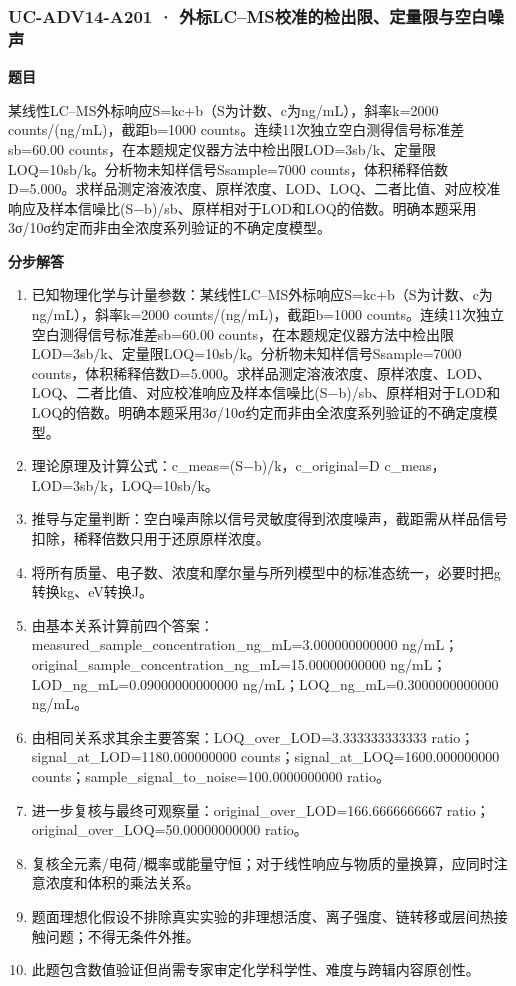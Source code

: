 \documentclass[UTF8,11pt,a4paper]{ctexart}
\begin{document}
\subsubsection*{UC-ADV14-A201 · 外标LC–MS校准的检出限、定量限与空白噪声}
\noindent\textbf{题目}\par
某线性LC–MS外标响应S=kc+b（S为计数、c为ng/mL），斜率k=2000 counts/(ng/mL)，截距b=1000 counts。连续11次独立空白测得信号标准差sb=60.00 counts，在本题规定仪器方法中检出限LOD=3sb/k、定量限LOQ=10sb/k。分析物未知样信号Ssample=7000 counts，体积稀释倍数D=5.000。求样品测定溶液浓度、原样浓度、LOD、LOQ、二者比值、对应校准响应及样本信噪比(S−b)/sb、原样相对于LOD和LOQ的倍数。明确本题采用3σ/10σ约定而非由全浓度系列验证的不确定度模型。\par
\medskip\noindent\textbf{分步解答}
\begin{enumerate}
\item 已知物理化学与计量参数：某线性LC–MS外标响应S=kc+b（S为计数、c为ng/mL），斜率k=2000 counts/(ng/mL)，截距b=1000 counts。连续11次独立空白测得信号标准差sb=60.00 counts，在本题规定仪器方法中检出限LOD=3sb/k、定量限LOQ=10sb/k。分析物未知样信号Ssample=7000 counts，体积稀释倍数D=5.000。求样品测定溶液浓度、原样浓度、LOD、LOQ、二者比值、对应校准响应及样本信噪比(S−b)/sb、原样相对于LOD和LOQ的倍数。明确本题采用3σ/10σ约定而非由全浓度系列验证的不确定度模型。
\item 理论原理及计算公式：c\_meas=(S−b)/k，c\_original=D c\_meas，LOD=3sb/k，LOQ=10sb/k。
\item 推导与定量判断：空白噪声除以信号灵敏度得到浓度噪声，截距需从样品信号扣除，稀释倍数只用于还原原样浓度。
\item 将所有质量、电子数、浓度和摩尔量与所列模型中的标准态统一，必要时把g转换kg、eV转换J。
\item 由基本关系计算前四个答案：measured\_sample\_concentration\_ng\_mL=3.000000000000 ng/mL；original\_sample\_concentration\_ng\_mL=15.00000000000 ng/mL；LOD\_ng\_mL=0.09000000000000 ng/mL；LOQ\_ng\_mL=0.3000000000000 ng/mL。
\item 由相同关系求其余主要答案：LOQ\_over\_LOD=3.333333333333 ratio；signal\_at\_LOD=1180.000000000 counts；signal\_at\_LOQ=1600.000000000 counts；sample\_signal\_to\_noise=100.0000000000 ratio。
\item 进一步复核与最终可观察量：original\_over\_LOD=166.6666666667 ratio；original\_over\_LOQ=50.00000000000 ratio。
\item 复核全元素/电荷/概率或能量守恒；对于线性响应与物质的量换算，应同时注意浓度和体积的乘法关系。
\item 题面理想化假设不排除真实实验的非理想活度、离子强度、链转移或层间热接触问题；不得无条件外推。
\item 此题包含数值验证但尚需专家审定化学科学性、难度与跨辑内容原创性。
\end{enumerate}
\end{document}
